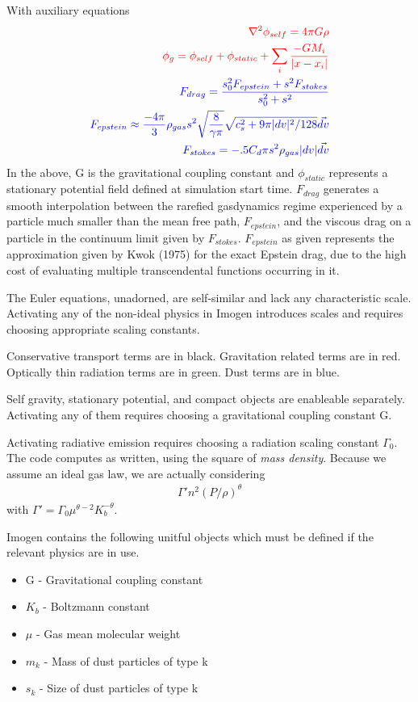 \documentclass[letterpaper,12pt]{article}
\begin{document}
With auxiliary equations
\begin{align*}
\textcolor{red}{\nabla^2 \phi_{self} = 4 \pi G \rho} \\
\textcolor{red}{\phi_g = \phi_{self} + \phi_{static} + \sum_{i} \frac{-G M_i}{|x - x_i|} } \\
\textcolor{blue}{F_{drag} = \frac{s_0^2 F_{epstein} + s^2 F_{stokes}}{s_0^2 + s^2}} \\
\textcolor{blue}{F_{epstein} \approx \frac{-4 \pi}{3} \rho_{gas} s^2 \sqrt{\frac{8}{\gamma \pi}} \sqrt{c_s^2 + 9 \pi |dv|^2 / 128}  \vec{dv} } \\
\textcolor{blue}{F_{stokes} = -.5 C_d \pi s^2 \rho_{gas} |dv| \vec{dv} }
\end{align*}
In the above, G is the gravitational coupling constant and $\phi_{static}$ represents a stationary
potential field defined at simulation start time.
$F_{drag}$ generates a smooth interpolation between the rarefied gasdynamics regime experienced
by a particle much smaller than the mean free path, $F_{epstein}$, and the viscous drag 
on a particle in the continuum limit given by $F_{stokes}$.
$F_{epstein}$ as given represents the approximation
given by Kwok (1975) for the exact Epstein drag, due to the high cost of evaluating multiple
transcendental functions occurring in it.


The Euler equations, unadorned, are self-similar and lack any characteristic scale. Activating
any of the non-ideal physics in Imogen introduces scales and requires choosing appropriate scaling
constants.

Conservative transport terms are in black. Gravitation related terms are in red.
Optically thin radiation terms are in green. Dust terms are in blue.

Self gravity, stationary potential, and compact objects are enableable separately.
Activating any of them requires choosing a gravitational coupling constant G.

Activating radiative emission requires choosing a radiation scaling constant $\Gamma_0$.
The code computes as written, using the square of \textit{mass density}. Because we assume an
ideal gas law, we are actually considering
\begin{align*}
\Gamma' n^2 (P/\rho)^{\theta}
\end{align*}
with $\Gamma' = \Gamma_0 \mu^{\theta-2} K_b^{-\theta}$.

Imogen contains the following unitful objects which must be defined if the relevant
physics are in use.
\begin{itemize}
\item G - Gravitational coupling constant
\item $K_b$ - Boltzmann constant
\item $\mu$ - Gas mean molecular weight
\item $m_k$ - Mass of dust particles of type k
\item $s_k$ - Size of dust particles of type k
\end{itemize}
\end{document}
